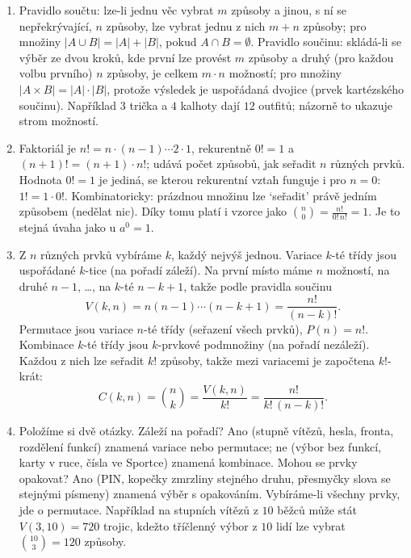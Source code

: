 \begin{enumerate}[label=\textbf{\arabic*.}, leftmargin=*, itemsep=0.8em]
  \item {}
  Pravidlo součtu: lze-li jednu věc vybrat $m$ způsoby a jinou, s ní se nepřekrývající, $n$ způsoby, lze vybrat jednu z nich $m + n$ způsoby; pro množiny $|A\cup B| = |A| + |B|$, pokud $A\cap B = \emptyset$. Pravidlo součinu: skládá-li se výběr ze dvou kroků, kde první lze provést $m$ způsoby a druhý (pro každou volbu prvního) $n$ způsoby, je celkem $m\cdot n$ možností; pro množiny $|A\times B| = |A|\cdot|B|$, protože výsledek je uspořádaná dvojice (prvek kartézského součinu). Například $3$ trička a $4$ kalhoty dají $12$ outfitů; názorně to ukazuje strom možností. 

  \item {}
  Faktoriál je $n! = n\cdot(n - 1)\cdots 2\cdot 1$, rekurentně $0! = 1$ a $(n + 1)! = (n + 1)\cdot n!$; udává počet způsobů, jak seřadit $n$ různých prvků. Hodnota $0! = 1$ je jediná, se kterou rekurentní vztah funguje i pro $n = 0$: $1! = 1\cdot 0!$. Kombinatoricky: prázdnou množinu lze `seřadit' právě jedním způsobem (nedělat nic). Díky tomu platí i vzorce jako $\binom{n}{0} = \frac{n!}{0!\,n!} = 1$. Je to stejná úvaha jako u $a^0 = 1$.

  \item {}
  Z $n$ různých prvků vybíráme $k$, každý nejvýš jednou. Variace $k$-té třídy jsou uspořádané $k$-tice (na pořadí záleží). Na první místo máme $n$ možností, na druhé $n - 1$, \ldots, na $k$-té $n - k + 1$, takže podle pravidla součinu
  \begin{equation*}
    V(k, n) = n(n - 1)\cdots(n - k + 1) = \frac{n!}{(n - k)!}.
  \end{equation*}
  Permutace jsou variace $n$-té třídy (seřazení všech prvků), $P(n) = n!$. Kombinace $k$-té třídy jsou $k$-prvkové podmnožiny (na pořadí nezáleží). Každou z nich lze seřadit $k!$ způsoby, takže mezi variacemi je započtena $k!$-krát:
  \begin{equation*}
    C(k, n) = \binom{n}{k} = \frac{V(k, n)}{k!} = \frac{n!}{k!\,(n - k)!}.
  \end{equation*}

  \item {}
  Položíme si dvě otázky. Záleží na pořadí? Ano (stupně vítězů, hesla, fronta, rozdělení funkcí) znamená variace nebo permutace; ne (výbor bez funkcí, karty v ruce, čísla ve Sportce) znamená kombinace. Mohou se prvky opakovat? Ano (PIN, kopečky zmrzliny stejného druhu, přesmyčky slova se stejnými písmeny) znamená výběr s opakováním. Vybíráme-li všechny prvky, jde o permutace. Například na stupních vítězů z $10$ běžců může stát $V(3, 10) = 720$ trojic, kdežto tříčlenný výbor z $10$ lidí lze vybrat $\binom{10}{3} = 120$ způsoby.


\end{enumerate}
